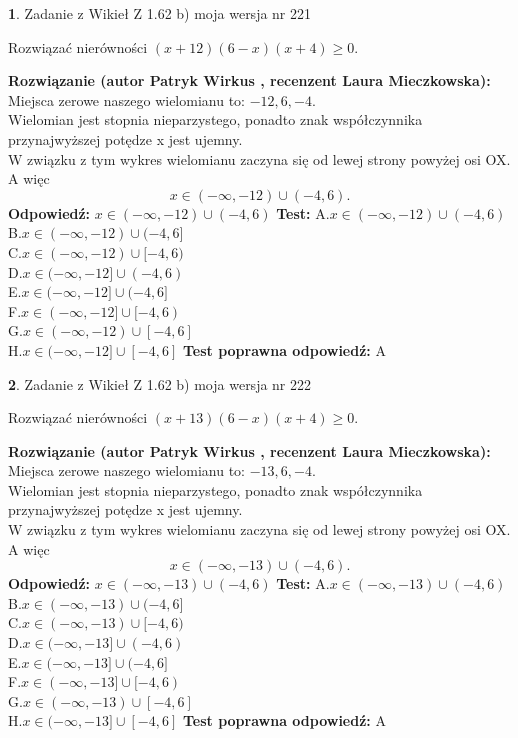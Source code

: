 \documentclass[12pt, a4paper]{article}
\theoremstyle{definition} %
\newtheorem{zad}{}
\newcommand{\zadStart}[1]{\begin{zad}#1\newline}
\newcommand{\zadStop}{\end{zad}}
\newcommand{\rozwStart}[2]{\noindent \textbf{Rozwiązanie (autor #1 , recenzent #2): }\newline}
\newcommand{\rozwStop}{\newline}
\newcommand{\odpStart}{\noindent \textbf{Odpowiedź:}\newline}
\newcommand{\odpStop}{\newline}
\newcommand{\testStart}{\noindent \textbf{Test:}\newline}
\newcommand{\testStop}{\newline}
\newcommand{\kluczStart}{\noindent \textbf{Test poprawna odpowiedź:}\newline}
\newcommand{\kluczStop}{\newline}
\begin{document}
\zadStart{Zadanie z Wikieł Z 1.62 b) moja wersja nr 221}

Rozwiązać nierówności $(x+12)(6-x)(x+4)\ge0$.
\zadStop
\rozwStart{Patryk Wirkus}{Laura Mieczkowska}
Miejsca zerowe naszego wielomianu to: $-12, 6, -4$.\\
Wielomian jest stopnia nieparzystego, ponadto znak współczynnika przy\linebreak najwyższej potędze x jest ujemny.\\ W związku z tym wykres wielomianu zaczyna się od lewej strony powyżej osi OX. A więc $$x \in (-\infty,-12) \cup (-4,6).$$
\rozwStop
\odpStart
$x \in (-\infty,-12) \cup (-4,6)$
\odpStop
\testStart
A.$x \in (-\infty,-12) \cup (-4,6)$\\
B.$x \in (-\infty,-12) \cup (-4,6]$\\
C.$x \in (-\infty,-12) \cup [-4,6)$\\
D.$x \in (-\infty,-12] \cup (-4,6)$\\
E.$x \in (-\infty,-12] \cup (-4,6]$\\
F.$x \in (-\infty,-12] \cup [-4,6)$\\
G.$x \in (-\infty,-12) \cup [-4,6]$\\
H.$x \in (-\infty,-12] \cup [-4,6]$
\testStop
\kluczStart
A
\kluczStop



\zadStart{Zadanie z Wikieł Z 1.62 b) moja wersja nr 222}

Rozwiązać nierówności $(x+13)(6-x)(x+4)\ge0$.
\zadStop
\rozwStart{Patryk Wirkus}{Laura Mieczkowska}
Miejsca zerowe naszego wielomianu to: $-13, 6, -4$.\\
Wielomian jest stopnia nieparzystego, ponadto znak współczynnika przy\linebreak najwyższej potędze x jest ujemny.\\ W związku z tym wykres wielomianu zaczyna się od lewej strony powyżej osi OX. A więc $$x \in (-\infty,-13) \cup (-4,6).$$
\rozwStop
\odpStart
$x \in (-\infty,-13) \cup (-4,6)$
\odpStop
\testStart
A.$x \in (-\infty,-13) \cup (-4,6)$\\
B.$x \in (-\infty,-13) \cup (-4,6]$\\
C.$x \in (-\infty,-13) \cup [-4,6)$\\
D.$x \in (-\infty,-13] \cup (-4,6)$\\
E.$x \in (-\infty,-13] \cup (-4,6]$\\
F.$x \in (-\infty,-13] \cup [-4,6)$\\
G.$x \in (-\infty,-13) \cup [-4,6]$\\
H.$x \in (-\infty,-13] \cup [-4,6]$
\testStop
\kluczStart
A
\kluczStop
\end{document}
